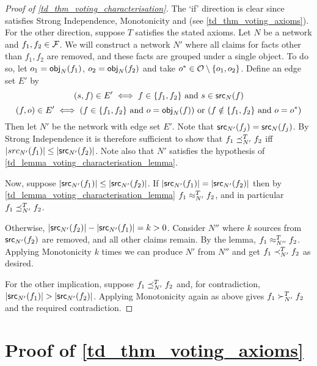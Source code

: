 \begin{proof}[Proof of \cref{td_thm_voting_characterisation}]

The `if' direction is clear since \voting{} satisfies Strong Independence,
    Monotonicity and \symmetry{} (see \cref{td_thm_voting_axioms}). For the other
direction, suppose $T$ satisfies the stated axioms. Let $N$ be a network and
$f_1, f_2 \in \mathcal{F}$. We will construct a network $N'$ where all claims for facts
other than $f_1, f_2$ are removed, and these facts are grouped under a single
object. To do so, let $o_1 = \mathsf{obj}_N(f_1)$, $o_2 = \mathsf{obj}_N(f_2)$ and take $o^*
\in \mathcal{O} \setminus \{o_1, o_2\}$.  Define an edge set $E'$ by
\[
    (s, f) \in E' \iff f \in \{f_1, f_2\} \text{ and } s \in \mathsf{src}_N(f)
\]
\[
    (f, o) \in E'
    \iff
        (f \in \{f_1, f_2\} \text{ and } o = \mathsf{obj}_N(f))
        \text{ or }
        (f \notin \{f_1, f_2\} \text{ and } o = o^*)
\]
Then let $N'$ be the network with edge set $E'$. Note that $\mathsf{src}_{N'}(f_j) =
\mathsf{src}_N(f_j)$. By Strong Independence it is therefore sufficient to show that
$f_1 \preceq_{N'}^T f_2$ iff $|src_{N'}(f_1)| \le |\mathsf{src}_{N'}(f_2)|$. Note also
that $N'$ satisfies the hypothesis of \cref{td_lemma_voting_characterisation_lemma}.

Now, suppose $|\mathsf{src}_{N'}(f_1)| \le |\mathsf{src}_{N'}(f_2)|$. If $|\mathsf{src}_{N'}(f_1)| =
|\mathsf{src}_{N'}(f_2)|$ then by \cref{td_lemma_voting_characterisation_lemma} $f_1
\approx_{N'}^T f_2$, and in particular $f_1 \preceq_{N'}^T f_2$.

Otherwise, $|\mathsf{src}_{N'}(f_2)| - |\mathsf{src}_{N'}(f_1)| = k > 0$. Consider $N''$ where
$k$ sources from $\mathsf{src}_{N'}(f_2)$ are removed, and all other claims remain. By
the lemma, $f_1 \approx_{N''}^T f_2$. Applying Monotonicity $k$ times we can
produce $N'$ from $N''$ and get $f_1 \prec_{N'}^T f_2$ as desired.

For the other implication, suppose $f_1 \preceq_{N'}^T f_2$ and, for
contradiction, $|\mathsf{src}_{N'}(f_1)| > |\mathsf{src}_{N'}(f_2)|$. Applying Monotonicity
again as above gives $f_1 \succ_{N'}^T f_2$ and the required contradiction.
\end{proof}

\section{Proof of \cref{td_thm_voting_axioms}}

